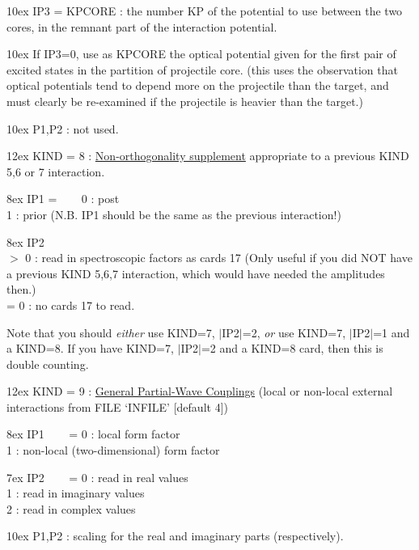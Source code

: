 \documentclass[11pt]{article}
\begin{document}
\hangindent 10ex
 IP3 = KPCORE : the number KP of the potential to use between
the two cores, in the remnant part of the interaction potential.

\hangindent 10ex
       If IP3=0, use as KPCORE the optical potential given for
the first pair of excited states in the partition of projectile core.
(this uses the observation that optical potentials tend to depend
more on the projectile than the target, and must clearly be re-examined
if the projectile is heavier than the target.)

\hangindent 10ex
 P1,P2 : not used.
\bigskip


\hangindent 12ex
KIND = 8 :
\underline{Non-orthogonality supplement}
appropriate to a previous
KIND 5,6 or 7 interaction.


\hangindent 8ex  IP1 =
~~~  0 : post
\\  1 : prior
 (N.B. IP1 should be the same as the previous interaction!)



\hangindent 8ex  IP2
\\  $>$ 0 : read in spectroscopic factors as cards 17
 (Only useful if you did NOT have a previous KIND 5,6,7
interaction, which would have needed the amplitudes then.)
\\  = 0 : no cards 17 to read.


Note that you should {\em either} use KIND=7, $|$IP2$|$=2,
{\em or} use  KIND=7, $|$IP2$|$=1  and a KIND=8.
If you have KIND=7, $|$IP2$|$=2 and a KIND=8 card, then this is
double counting.
\bigskip


\hangindent 12ex
KIND = 9 :
\underline{General Partial-Wave Couplings}
(local or non-local external interactions from FILE `INFILE' [default 4])

\hangindent 8ex  IP1
~~~  = 0 : local form factor
\\   1 : non-local (two-dimensional) form factor

\hangindent 7ex  IP2
~~~  = 0 : read in real values   
\\   1 : read in imaginary values   
\\   2 : read in complex values       

\hangindent 10ex
 P1,P2 : scaling for the real and imaginary parts (respectively).\\
\end{document}
